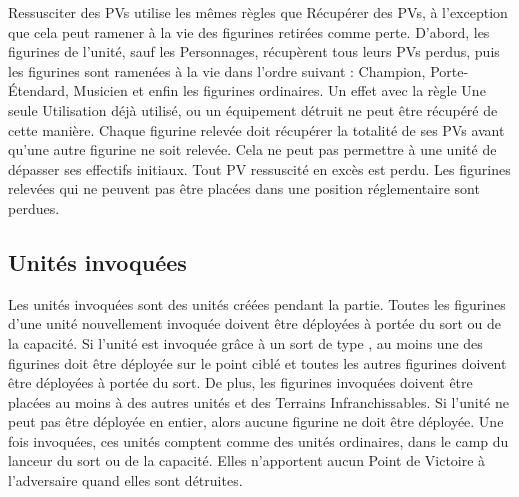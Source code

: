 Ressusciter des PVs utilise les mêmes règles que Récupérer des PVs, à l'exception que cela peut ramener à la vie des figurines retirées comme perte. D'abord, les figurines de l'unité, sauf les Personnages, récupèrent tous leurs PVs perdus, puis les figurines sont ramenées à la vie dans l'ordre suivant : Champion, Porte-Étendard, Musicien et enfin les figurines ordinaires.  Un effet avec la règle Une seule Utilisation déjà utilisé, ou un équipement détruit ne peut être récupéré de cette manière. Chaque figurine relevée doit récupérer la totalité de ses PVs avant qu'une autre figurine ne soit relevée. Cela ne peut pas permettre à une unité de dépasser ses effectifs initiaux. Tout PV ressuscité en excès est perdu. Les figurines relevées qui ne peuvent pas être placées dans une position réglementaire sont perdues.

\hypertarget{summonedunits}{\subsection{Unités invoquées}}
\label{summonedunits}

Les unités invoquées sont des unités créées pendant la partie. Toutes les figurines d'une unité nouvellement invoquée doivent être déployées à portée du sort ou de la capacité. Si l'unité est invoquée grâce à un sort de type \ground{}, au moins une des figurines doit être déployée sur le point ciblé et toutes les autres figurines doivent être déployées à portée du sort. De plus, les figurines invoquées doivent être placées au moins à  des autres unités et des Terrains Infranchissables. Si l'unité ne peut pas être déployée en entier, alors aucune figurine ne doit être déployée. Une fois invoquées, ces unités comptent comme des unités ordinaires, dans le camp du lanceur du sort ou de la capacité. Elles n'apportent aucun Point de Victoire à l'adversaire quand elles sont détruites.
